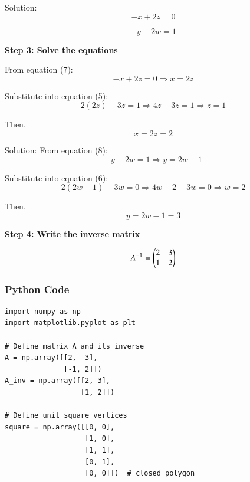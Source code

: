 \documentclass{beamer}
\begin{document}
\begin{frame}{Solution:}
\begin{equation}
-x + 2z = 0
\end{equation}

\begin{equation}
-y + 2w = 1
\end{equation}

\textbf{Step 3: Solve the equations}

From equation (7):
\begin{equation}
-x + 2z = 0 \Rightarrow x = 2z
\end{equation}

Substitute into equation (5):
\begin{equation}
2(2z) - 3z = 1 \Rightarrow 4z - 3z = 1 \Rightarrow z = 1
\end{equation}

Then,
\begin{equation}
x = 2z = 2
\end{equation}
\end{frame}
\begin{frame}{Solution:}
From equation (8):
\begin{equation}
-y + 2w = 1 \Rightarrow y = 2w - 1
\end{equation}

Substitute into equation (6):
\begin{equation}
2(2w - 1) - 3w = 0 \Rightarrow 4w - 2 - 3w = 0 \Rightarrow w = 2
\end{equation}

Then,
\begin{equation}
y = 2w - 1 = 3
\end{equation}

\textbf{Step 4: Write the inverse matrix}

\begin{equation}
A^{-1} = \begin{pmatrix}2 & 3 \\ 1 & 2\end{pmatrix}
\end{equation}

\end{frame}

\begin{frame}[fragile]
    \frametitle{Python Code}
    \begin{lstlisting}
import numpy as np
import matplotlib.pyplot as plt

# Define matrix A and its inverse
A = np.array([[2, -3],
              [-1, 2]])
A_inv = np.array([[2, 3],
                  [1, 2]])

# Define unit square vertices
square = np.array([[0, 0],
                   [1, 0],
                   [1, 1],
                   [0, 1],
                   [0, 0]])  # closed polygon
\end{lstlisting}
\end{frame}
\end{document}
